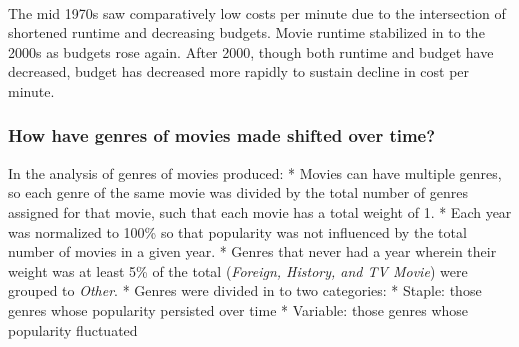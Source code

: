 \documentclass[11pt]{article}
\begin{document}
    \begin{center}
    \end{center}
    { \hspace*{\fill} \\}
    
    The mid 1970s saw comparatively low costs per minute due to the
intersection of shortened runtime and decreasing budgets. Movie runtime
stabilized in to the 2000s as budgets rose again. After 2000, though
both runtime and budget have decreased, budget has decreased more
rapidly to sustain decline in cost per minute.

    \subsubsection{How have genres of movies made shifted over
time?}\label{how-have-genres-of-movies-made-shifted-over-time}

In the analysis of genres of movies produced: * Movies can have multiple
genres, so each genre of the same movie was divided by the total number
of genres assigned for that movie, such that each movie has a total
weight of 1. * Each year was normalized to 100\% so that popularity was
not influenced by the total number of movies in a given year. * Genres
that never had a year wherein their weight was at least 5\% of the total
(\emph{Foreign, History, and TV Movie}) were grouped to \emph{Other}. *
Genres were divided in to two categories: * Staple: those genres whose
popularity persisted over time * Variable: those genres whose popularity
fluctuated
\end{document}

